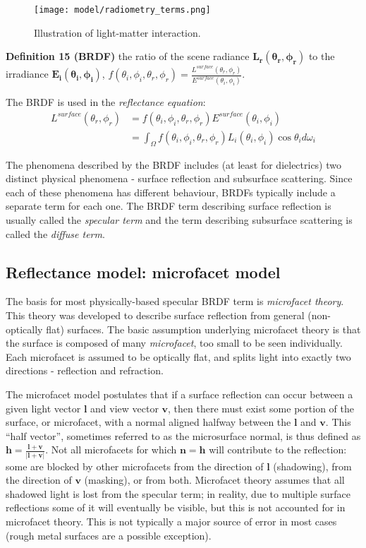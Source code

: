 \begin{figure}[!htbp]
\centering
\texttt{[image: model/radiometry\_terms.png]}
\caption{Illustration of light-matter interaction.}
\label{fig:radiometry_terms}
\end{figure}

\noindent\textbf{Definition 15 (BRDF)} the ratio of the scene radiance $\mathbf{L_r(\theta_r, \phi_r)}$ to the irradiance $\mathbf{E_i(\theta_i, \phi_i)}$, \ie $f(\theta_i, \phi_i, \theta_r, \phi_r)=\frac{L^{surface}(\theta_r, \phi_r)}{E^{surface}(\theta_i, \phi_i)}$.

The BRDF is used in the \textit{reflectance equation}:
\begin{align*}
L^{surface}(\theta_r, \phi_r)&=f(\theta_i, \phi_i, \theta_r, \phi_r)E^{surface}(\theta_i, \phi_i)\\
&= \int_\Omega f(\theta_i, \phi_i, \theta_r, \phi_r) L_i(\theta_i, \phi_i) \cos\theta_i d\omega_i
\end{align*}

The phenomena described by the BRDF includes (at least for dielectrics) two distinct physical phenomena - surface reflection and subsurface scattering. Since each of these phenomena has different behaviour, BRDFs typically include a separate term for each one. The BRDF term describing surface reflection is usually called the \textit{specular term} and the term describing subsurface scattering is called the \textit{diffuse term}.

\subsection{Reflectance model: microfacet model}
\label{sec:microfacet_model}
The basis for most physically-based specular BRDF term is \textit{microfacet theory}. This theory was developed to describe surface reflection from general (non-optically flat) surfaces. The basic assumption underlying microfacet theory is that the surface is composed of many \textit{microfacet}, too small to be seen individually. Each microfacet is assumed to be optically flat, and splits light into exactly two directions - reflection and refraction.

The microfacet model postulates that if a surface reflection can occur between a given light vector $\mathbf{l}$ and view vector $\mathbf{v}$, then there must exist some portion of the surface, or microfacet, with a normal aligned halfway between the $\mathbf{l}$ and $\mathbf{v}$. This ``half vector'', sometimes referred to as the microsurface normal, is thus defined as $\mathbf{h}=\frac{\mathbf{l}+\mathbf{v}}{|\mathbf{l}+\mathbf{v}|}$. Not all microfacets for which $\mathbf{n}=\mathbf{h}$ will contribute to the reflection: some are blocked by other microfacets from the direction of $\mathbf{l}$ (shadowing), from the direction of $\mathbf{v}$ (masking), or from both. Microfacet theory assumes that all shadowed light is lost from the specular term; in reality, due to multiple surface reflections some of it will eventually be visible, but this is not accounted for in microfacet theory. This is not typically a major source of error in most cases (rough metal surfaces are a possible exception).

